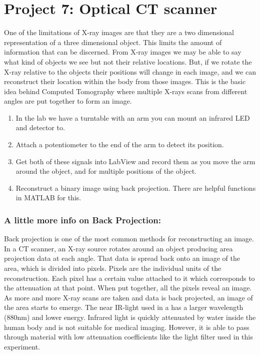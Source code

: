 \documentclass[12pt]{article}
\begin{document}
\newpage

\section*{Project 7: Optical CT scanner}

One of the limitations of X-ray images are that they are a two dimensional representation of a three dimensional object. 
This limits the amount of information that can be discerned. 
From X-ray images we may be able to say what kind of objects we see but not their relative locations. 
But, if we rotate the X-ray relative to the objects their positions will change in each image, and we can reconstruct their
location within the body from those images. 
This is the basic idea behind Computed Tomography where multiple X-rays scans from different angles are put together to form an image. 

\begin{enumerate}
\item In the lab we have a turntable with an arm you can mount an infrared LED and detector to. 
\item Attach a potentiometer to the end of the arm to detect its position. 
\item Get both of these signals into LabView and record them as you move the arm around the object, and 
for multiple positions of the object.
\item Reconstruct a binary image using back projection. There are helpful functions in MATLAB for this.
\end{enumerate}
\subsubsection*{A little more info on Back Projection:}
Back projection is one of the most common methods for reconstructing an image. 
In a CT scanner, an X-ray source rotates around an object producing area projection data at each angle. 
That data is spread back onto an image of the area, which is divided into pixels. 
Pixels are the individual units of the reconstruction. 
Each pixel has a certain value attached to it which corresponds to the attenuation at that point. 
When put together, all the pixels reveal an image. 
As more and more X-ray scans are taken and data is back projected, an image of the area starts to emerge.
The near IR-light used in a has a larger wavelength (880nm) and lower energy. 
Infrared light is quickly attenuated by water inside the human body and is not suitable for medical imaging. 
However, it is able to pass through material with low attenuation coefficients like the light filter used in this experiment. 
\end{document}
